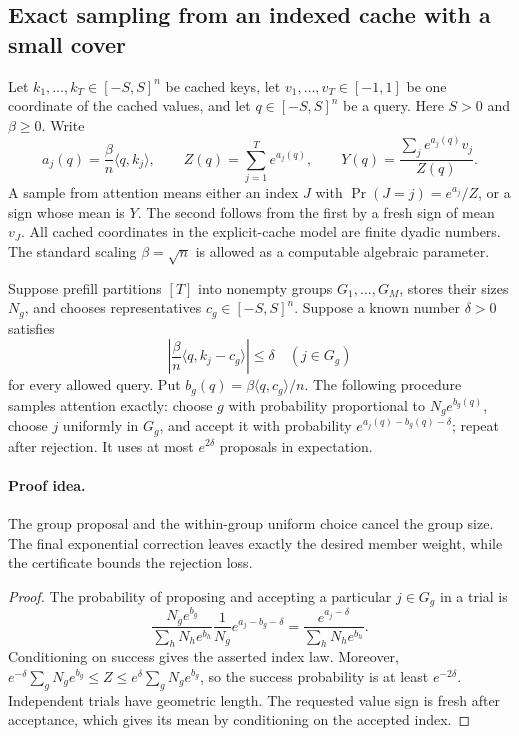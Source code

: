 \subsection{Exact sampling from an indexed cache with a small cover}
\label{sec:newcover}

Let $k_1,\ldots,k_T\in[-S,S]^n$ be cached keys, let
$v_1,\ldots,v_T\in[-1,1]$ be one coordinate of the cached values,
and let $q\in[-S,S]^n$ be a query. Here $S>0$ and $\beta\ge0$.
Write
\[
 a_j(q)=\frac\beta n\langle q,k_j\rangle,
 \qquad Z(q)=\sum_{j=1}^T e^{a_j(q)},
 \qquad Y(q)=\frac{\sum_j e^{a_j(q)}v_j}{Z(q)}.
\]
A sample from attention means either an index $J$ with
$\Pr(J=j)=e^{a_j}/Z$, or a sign whose mean is $Y$.
The second follows from the first by a fresh sign of mean $v_J$.
All cached coordinates in the explicit-cache model are finite dyadic
numbers. The standard scaling $\beta=\sqrt n$ is allowed as a
computable algebraic parameter.

\begin{lemma}
\label{lem:newpartition}
Suppose prefill partitions $[T]$ into nonempty groups
$G_1,\ldots,G_M$, stores their sizes $N_g$, and chooses representatives
$c_g\in[-S,S]^n$. Suppose a known number $\delta>0$ satisfies
\[
 \left|\frac\beta n\langle q,k_j-c_g\rangle\right|\le\delta
 \quad(j\in G_g)
\]
for every allowed query. Put $b_g(q)=\beta\langle q,c_g\rangle/n$.
The following procedure samples attention exactly:
choose $g$ with probability proportional to $N_g e^{b_g(q)}$,
choose $j$ uniformly in $G_g$, and accept it with probability
$e^{a_j(q)-b_g(q)-\delta}$; repeat after rejection.
It uses at most $e^{2\delta}$ proposals in expectation.
\end{lemma}
\paragraph{Proof idea.}
The group proposal and the within-group uniform choice cancel the group size.  The final exponential correction leaves exactly the desired member weight, while the certificate bounds the rejection loss.

\begin{proof}
The probability of proposing and accepting a particular $j\in G_g$
in a trial is
\[
 \frac{N_ge^{b_g}}{\sum_hN_he^{b_h}}\frac1{N_g}
 e^{a_j-b_g-\delta}
 =\frac{e^{a_j-\delta}}{\sum_hN_he^{b_h}}.
\]
Conditioning on success gives the asserted index law. Moreover,
$e^{-\delta}\sum_gN_ge^{b_g}\le Z\le
e^{\delta}\sum_gN_ge^{b_g}$, so the success probability is at
least $e^{-2\delta}$. Independent trials have geometric length.
The requested value sign is fresh after acceptance, which gives its
mean by conditioning on the accepted index.
\end{proof}

